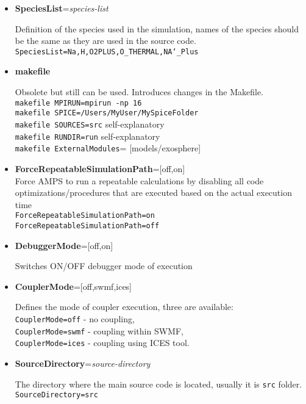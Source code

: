 \begin{itemize}

\item {\bf SpeciesList}={\it species-list}

Definition of the species used in the simulation, names of the species should
be the same as they are used in the source code. \\
{\tt SpeciesList=Na,H,O2PLUS,O\_THERMAL,NA\char`_Plus}

\item {\bf makefile}

Obsolete but still can be used. Introduces changes in the Makefile.\\
{\tt makefile MPIRUN=mpirun -np 16}\\
{\tt makefile SPICE=/Users/MyUser/MySpiceFolder} \\
{\tt makefile  SOURCES=src}  self-explanatory\\
{\tt makefile  RUNDIR=run}  self-explanatory\\
{\tt makefile ExternalModules}= [models/exosphere]


\item {\bf ForceRepeatableSimulationPath}=[off,on] \\ Force AMPS to run a repeatable calculations by disabling all code optimizations/procedures that are executed based on the actual execution time \\ {\tt ForceRepeatableSimulationPath=on} \\ {\tt  ForceRepeatableSimulationPath=off}  

\item {\bf DebuggerMode}=[off,on]

Switches ON/OFF debugger mode of execution

\item {\bf CouplerMode}=[off,swmf,ices]

Defines the mode of coupler execution, three are available:
\\{\tt CouplerMode=off} - no coupling, 
\\{\tt CouplerMode=swmf} - coupling within SWMF, 
\\{\tt CouplerMode=ices} - coupling using ICES tool.

\item {\bf SourceDirectory}={\it source-directory}

The directory where the main source code is located, usually it is
{\tt src} folder.\\
{\tt SourceDirectory=src}


\end{itemize}
